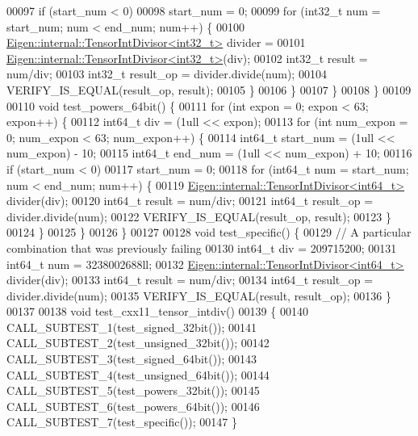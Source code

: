 \begin{DoxyCode}
00097       \textcolor{keywordflow}{if} (start\_num < 0)
00098         start\_num = 0;
00099       \textcolor{keywordflow}{for} (int32\_t num = start\_num; num < end\_num; num++) \{
00100         \hyperlink{struct_eigen_1_1internal_1_1_tensor_int_divisor}{Eigen::internal::TensorIntDivisor<int32\_t>} divider =
00101           \hyperlink{struct_eigen_1_1internal_1_1_tensor_int_divisor}{Eigen::internal::TensorIntDivisor<int32\_t>}(div);
00102         int32\_t result = num/div;
00103         int32\_t result\_op = divider.divide(num);
00104         VERIFY\_IS\_EQUAL(result\_op, result);
00105       \}
00106     \}
00107   \}
00108 \}
00109 
00110 \textcolor{keywordtype}{void} test\_powers\_64bit() \{
00111   \textcolor{keywordflow}{for} (\textcolor{keywordtype}{int} expon = 0; expon < 63; expon++) \{
00112     int64\_t div = (1ull << expon);
00113     \textcolor{keywordflow}{for} (\textcolor{keywordtype}{int} num\_expon = 0; num\_expon < 63; num\_expon++) \{
00114       int64\_t start\_num = (1ull << num\_expon) - 10;
00115       int64\_t end\_num = (1ull << num\_expon) + 10;
00116       \textcolor{keywordflow}{if} (start\_num < 0)
00117         start\_num = 0;
00118       \textcolor{keywordflow}{for} (int64\_t num = start\_num; num < end\_num; num++) \{
00119         \hyperlink{struct_eigen_1_1internal_1_1_tensor_int_divisor}{Eigen::internal::TensorIntDivisor<int64\_t>} divider(div);
00120         int64\_t result = num/div;
00121         int64\_t result\_op = divider.divide(num);
00122         VERIFY\_IS\_EQUAL(result\_op, result);
00123       \}
00124     \}
00125   \}
00126 \}
00127 
00128 \textcolor{keywordtype}{void} test\_specific() \{
00129   \textcolor{comment}{// A particular combination that was previously failing}
00130   int64\_t div = 209715200;
00131   int64\_t num = 3238002688ll;
00132   \hyperlink{struct_eigen_1_1internal_1_1_tensor_int_divisor}{Eigen::internal::TensorIntDivisor<int64\_t>} divider(div);
00133   int64\_t result = num/div;
00134   int64\_t result\_op = divider.divide(num);
00135   VERIFY\_IS\_EQUAL(result, result\_op);
00136 \}
00137 
00138 \textcolor{keywordtype}{void} test\_cxx11\_tensor\_intdiv()
00139 \{
00140   CALL\_SUBTEST\_1(test\_signed\_32bit());
00141   CALL\_SUBTEST\_2(test\_unsigned\_32bit());
00142   CALL\_SUBTEST\_3(test\_signed\_64bit());
00143   CALL\_SUBTEST\_4(test\_unsigned\_64bit());
00144   CALL\_SUBTEST\_5(test\_powers\_32bit());
00145   CALL\_SUBTEST\_6(test\_powers\_64bit());
00146   CALL\_SUBTEST\_7(test\_specific());
00147 \}
\end{DoxyCode}
